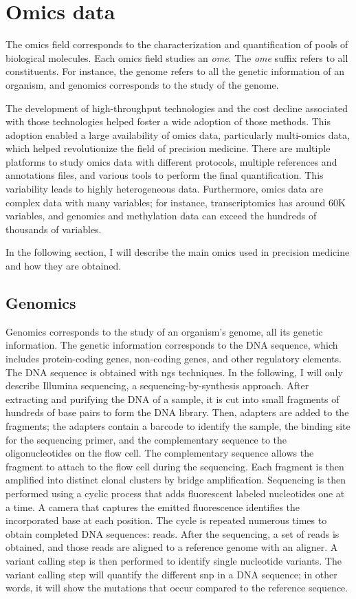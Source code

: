 \documentclass[../main.tex]{subfiles}
\begin{document}
\section{Omics data}
	The omics field corresponds to the characterization and quantification of pools of biological molecules.
	Each omics field studies an \emph{ome}.
	The \emph{ome} suffix refers to all constituents.
	For instance, the genome refers to all the genetic information of an organism, and genomics corresponds to the study of the genome.

	The development of high-throughput technologies and the cost decline associated with those technologies helped foster a wide adoption of those methods.
	This adoption enabled a large availability of omics data, particularly multi-omics data, which helped revolutionize the field of precision medicine.
	There are multiple platforms to study omics data with different protocols, multiple references and annotations files, and various tools to perform the final quantification.
	This variability leads to highly heterogeneous data.
	Furthermore, omics data are complex data with many variables; for instance, transcriptomics has around 60K variables, and genomics and methylation data can exceed the hundreds of thousands of variables.

	In the following section, I will describe the main omics used in precision medicine and how they are obtained.

	\subsection{Genomics}\label{subsec:genomics}
		Genomics corresponds to the study of an organism's genome, \ie{}all its genetic information.
		The genetic information corresponds to the DNA sequence, which includes protein-coding genes, non-coding genes, and other regulatory elements.
		The DNA sequence is obtained with \gls{ngs} techniques.
		In the following, I will only describe Illumina sequencing, a sequencing-by-synthesis approach.
		After extracting and purifying the DNA of a sample, it is cut into small fragments of hundreds of base pairs to form the DNA library.
		Then, adapters are added to the fragments; the adapters contain a barcode to identify the sample, the binding site for the sequencing primer, and the complementary sequence to the oligonucleotides on the flow cell.
		The complementary sequence allows the fragment to attach to the flow cell during the sequencing.
		Each fragment is then amplified into distinct clonal clusters by bridge amplification.
		Sequencing is then performed using a cyclic process that adds fluorescent labeled nucleotides one at a time.
		A camera that captures the emitted fluorescence identifies the incorporated base at each position.
		The cycle is repeated numerous times to obtain completed DNA sequences: reads.
		After the sequencing, a set of reads is obtained, and those reads are aligned to a reference genome with an aligner.
		A variant calling step is then performed to identify single nucleotide variants.
		The variant calling step will quantify the different \gls{snp} in a DNA sequence; in other words, it will show the mutations that occur compared to the reference sequence.
\end{document}
